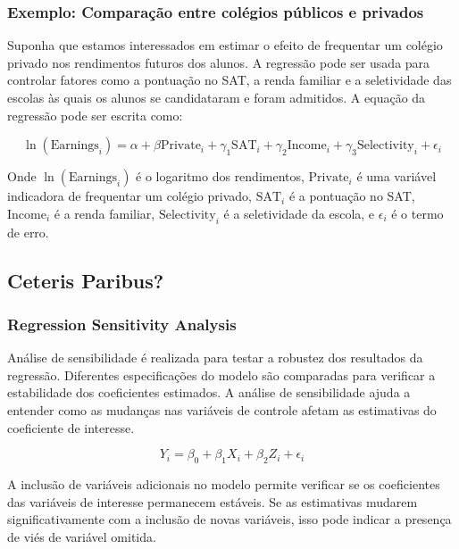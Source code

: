 \documentclass[a4paper,12pt]{article}[abntex2]
\begin{document}
\subsubsection*{Exemplo: Comparação entre colégios públicos e privados}

Suponha que estamos interessados em estimar o efeito de frequentar um colégio privado nos rendimentos futuros dos alunos. A regressão pode ser usada para controlar fatores como a pontuação no SAT, a renda familiar e a seletividade das escolas às quais os alunos se candidataram e foram admitidos. A equação da regressão pode ser escrita como:

\begin{equation}
    \ln(\text{Earnings}_i) = \alpha + \beta \text{Private}_i + \gamma_1 \text{SAT}_i + \gamma_2 \text{Income}_i + \gamma_3 \text{Selectivity}_i + \epsilon_i
\end{equation}

Onde \(\ln(\text{Earnings}_i)\) é o logaritmo dos rendimentos, \(\text{Private}_i\) é uma variável indicadora de frequentar um colégio privado, \(\text{SAT}_i\) é a pontuação no SAT, \(\text{Income}_i\) é a renda familiar, \(\text{Selectivity}_i\) é a seletividade da escola, e \(\epsilon_i\) é o termo de erro.

\subsection{Ceteris Paribus?}

\subsubsection*{Regression Sensitivity Analysis}

Análise de sensibilidade é realizada para testar a robustez dos resultados da regressão. Diferentes especificações do modelo são comparadas para verificar a estabilidade dos coeficientes estimados. A análise de sensibilidade ajuda a entender como as mudanças nas variáveis de controle afetam as estimativas do coeficiente de interesse.

\begin{equation}
    Y_i = \beta_0 + \beta_1 X_i + \beta_2 Z_i + \epsilon_i
\end{equation}

A inclusão de variáveis adicionais no modelo permite verificar se os coeficientes das variáveis de interesse permanecem estáveis. Se as estimativas mudarem significativamente com a inclusão de novas variáveis, isso pode indicar a presença de viés de variável omitida.
\end{document}
